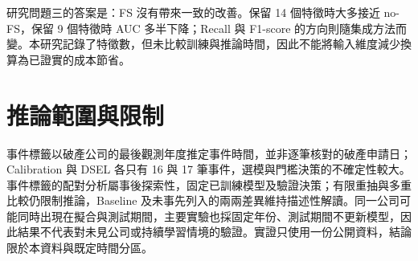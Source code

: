 研究問題三的答案是：FS 沒有帶來一致的改善。保留 14 個特徵時大多接近 no-FS，保留 9 個特徵時 AUC 多半下降；Recall 與 F1-score 的方向則隨集成方法而變。本研究記錄了特徵數，但未比較訓練與推論時間，因此不能將輸入維度減少換算為已證實的成本節省。

\section{推論範圍與限制}

事件標籤以破產公司的最後觀測年度推定事件時間，並非逐筆核對的破產申請日；Calibration 與 DSEL 各只有 16 與 17 筆事件，選模與門檻決策的不確定性較大。事件標籤的配對分析屬事後探索性，固定已訓練模型及驗證決策；有限重抽與多重比較仍限制推論，Baseline 及未事先列入的兩兩差異維持描述性解讀。同一公司可能同時出現在擬合與測試期間，主要實驗也採固定年份、測試期間不更新模型，因此結果不代表對未見公司或持續學習情境的驗證。實證只使用一份公開資料，結論限於本資料與既定時間分區。
\endgroup
